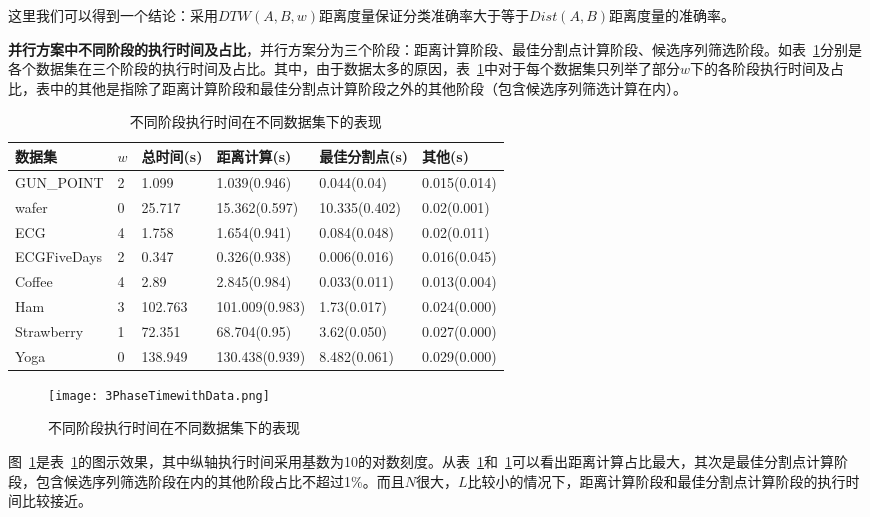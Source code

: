 这里我们可以得到一个结论：采用$DTW(A,B,w)$距离度量保证分类准确率大于等于$Dist(A,B)$距离度量的准确率。

\textbf{并行方案中不同阶段的执行时间及占比}，并行方案分为三个阶段：距离计算阶段、最佳分割点计算阶段、候选序列筛选阶段。如表~\ref{tab:OverviewTime}分别是各个数据集在三个阶段的执行时间及占比。其中，由于数据太多的原因，表~\ref{tab:OverviewTime}中对于每个数据集只列举了部分$w$下的各阶段执行时间及占比，表中的其他是指除了距离计算阶段和最佳分割点计算阶段之外的其他阶段（包含候选序列筛选计算在内）。

\begin{table}[htbp]
	\centering
	\begin{minipage}{0.9\textwidth}
		\caption{不同阶段执行时间在不同数据集下的表现}
		\label{tab:OverviewTime}
		\begin{tabular}{p{2cm}p{1cm}p{2cm}p{2cm}p{2.5cm}p{2cm}}
			\toprule[1.5pt]
			{\heiti 数据集} &{\heiti $w$ } &{\heiti 总时间(s) } &{\heiti 距离计算(s) } &{\heiti 最佳分割点(s) } &{\heiti 其他(s) }
			\\\midrule[1pt]
			GUN\_POINT & 2 & 1.099 & 1.039(0.946) & 0.044(0.04) & 0.015(0.014)\\
			wafer & 0 & 25.717 & 15.362(0.597) & 10.335(0.402) & 0.02(0.001)\\
			ECG & 4 & 1.758 & 1.654(0.941) & 0.084(0.048) & 0.02(0.011)\\
			ECGFiveDays & 2 & 0.347 & 0.326(0.938) & 0.006(0.016) & 0.016(0.045)\\
			Coffee & 4 & 2.89 & 2.845(0.984) & 0.033(0.011) & 0.013(0.004)\\
			Ham & 3 & 102.763 & 101.009(0.983) & 1.73(0.017) & 0.024(0.000)\\
			Strawberry & 1 & 72.351 & 68.704(0.95) & 3.62(0.050) & 0.027(0.000)\\
			Yoga & 0 & 138.949 & 130.438(0.939) & 8.482(0.061) & 0.029(0.000)\\
			\bottomrule[1.5pt]
		\end{tabular}
	\end{minipage}
\end{table}

\begin{figure}[H] %
	\centering
	\texttt{[image: 3PhaseTimewithData.png]}
	\caption{不同阶段执行时间在不同数据集下的表现}
	\label{fig:3PhaseTimewithData}
\end{figure}

图~\ref{fig:3PhaseTimewithData}是表~\ref{tab:OverviewTime}的图示效果，其中纵轴执行时间采用基数为10的对数刻度。从表~\ref{tab:OverviewTime}和~\ref{fig:3PhaseTimewithData}可以看出距离计算占比最大，其次是最佳分割点计算阶段，包含候选序列筛选阶段在内的其他阶段占比不超过1\%。而且$N$很大，$L$比较小的情况下，距离计算阶段和最佳分割点计算阶段的执行时间比较接近。


